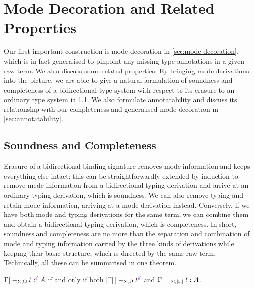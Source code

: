 
\section{Mode Decoration and Related Properties}\label{sec:pre-synthesis}

Our first important construction is mode decoration in \cref{sec:mode-decoration}, which is in fact generalised to pinpoint any missing type annotations in a given raw term.
We also discuss some related properties:
By bringing mode derivations into the picture, we are able to give a natural formulation of soundness and completeness of a bidirectional type system with respect to its erasure to an ordinary type system in \cref{sec:soundness-and-completeness}.
We also formulate  annotatability and discuss its relationship with our completeness and generalised mode decoration in \cref{sec:annotatability}.

\subsection{Soundness and Completeness}
\label{sec:soundness-and-completeness}


Erasure of a bidirectional binding signature removes mode information and keeps everything else intact; this can be straightforwardly extended by induction to remove mode information from a bidirectional typing derivation and arrive at an ordinary typing derivation, which is soundness.
We can also remove typing and retain mode information, arriving at a mode derivation instead.
Conversely, if we have both mode and typing derivations for the same term, we can combine them and obtain a bidirectional typing derivation, which is completeness.
In short, soundness and completeness are no more than the separation and combination of mode and typing information carried by the three kinds of derivations while keeping their basic structure, which is directed by the same raw term.
Technically, all these can be summarised in one theorem.

\begin{theorem}\label{lem:soundness-completeness}
$\Gamma |-_{\Sigma, \Omega} t :^\dir{d} A$ if and only if both\/ $\erase\Gamma |-_{\Sigma, \Omega} t^\dir{d}$ and\/ $\Gamma |-_{\Sigma, \left|\Omega\right|} t : A$.
\end{theorem}

